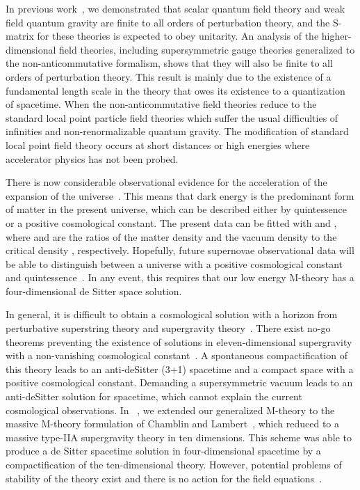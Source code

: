 \documentclass[a4paper,12pt]{article}
\begin{document}
In previous work~\cite{Moffat2,Moffat3,Moffat4}, we
demonstrated that scalar quantum field theory and weak field quantum
gravity are finite to all orders of perturbation theory, and the S-matrix
for these theories is expected to obey unitarity. An analysis of the
higher-dimensional field theories, including supersymmetric gauge
theories generalized to the non-anticommutative formalism, shows that they
will also be finite to all orders of perturbation theory. This result is
mainly due to the existence of a fundamental length scale \myHighlight{$\ell$}\coordHE{} in the
theory that owes its existence to a quantization of spacetime. When
\coordHE{} the non-anticommutative field theories reduce to the
standard local point particle field theories which suffer the usual
difficulties of infinities and non-renormalizable quantum gravity. The
modification of standard local point field theory occurs at short
distances or high energies where accelerator physics has not been probed.

There is now considerable observational evidence for the acceleration of
the expansion of the universe~\cite{Perlmutter}. This means that dark
energy is the predominant form of matter in the present universe, which
can be described either by quintessence~\cite{Caldwell} or a positive
cosmological constant. The present data can be fitted with \coordHE{} and \coordHE{}, where \coordHE{} and
\myHighlight{$\Omega_{\lambda}$}\coordHE{} are the ratios of the matter density \coordHE{} and the
vacuum density \coordHE{} to the
critical density \coordHE{}, respectively. Hopefully, future supernovae
observational data will be able to distinguish between a universe with a
positive cosmological constant and quintessence~\cite{Copeland}. In any
event, this requires that our low energy M-theory has a four-dimensional de
Sitter space solution.

In general, it is difficult to obtain a cosmological
solution with a horizon from perturbative superstring theory and
supergravity theory~\cite{Witten}. There exist no-go theorems preventing
the existence of solutions in eleven-dimensional supergravity with a
non-vanishing cosmological constant~\cite{Maldacena}. A spontaneous
compactification of this theory leads to an anti-deSitter (3+1) spacetime
and a compact \coordHE{} space with a positive cosmological constant. Demanding
a supersymmetric vacuum leads to an anti-deSitter solution for spacetime,
which cannot explain the current cosmological observations. In
~\cite{Moffat}, we extended our generalized M-theory to the massive
M-theory formulation of Chamblin and Lambert~\cite{Lambert}, which reduced
to a massive type-IIA supergravity theory in ten dimensions. This scheme
was able to produce a de Sitter spacetime solution in four-dimensional
spacetime by a compactification of the ten-dimensional theory. However,
potential problems of stability of the theory exist and there is no action
for the field equations~\cite{Lambert2}.
\end{document}
